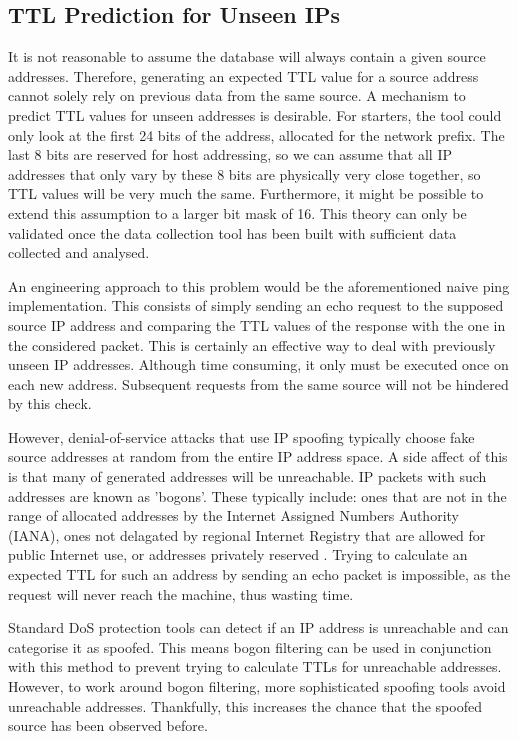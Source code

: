 \documentclass[12pt,twoside]{article}
\begin{document}
\subsection{TTL Prediction for Unseen IPs}
It is not reasonable to assume the database will always contain a given source addresses. Therefore, generating an expected TTL value for a source address cannot solely rely on previous data from the same source. A mechanism to predict TTL values for unseen addresses is desirable. For starters, the tool could only look at the first 24 bits of the address, allocated for the network prefix. The last 8 bits are reserved for host addressing, so we can assume that all IP addresses that only vary by these 8 bits are physically very close together, so TTL values will be very much the same. Furthermore, it might be possible to extend this assumption to a larger bit mask of 16. This theory can only be validated once the data collection tool has been built with sufficient data collected and analysed.

An engineering approach to this problem would be the aforementioned naive ping implementation. This consists of simply sending an echo request to the supposed source IP address and comparing the TTL values of the response with the one in the considered packet. This is certainly an effective way to deal with previously unseen IP addresses. Although time consuming, it only must be executed once on each new address. Subsequent requests from the same source will not be hindered by this check.

However, denial-of-service attacks that use IP spoofing typically choose fake source addresses at random from the entire IP address space. A side affect of this is that many of generated addresses will be unreachable. IP packets with such addresses are known as 'bogons'. These typically include: ones that are not in the range of allocated addresses by the Internet Assigned Numbers Authority (IANA), ones not delagated by regional Internet Registry that are allowed for public Internet use, or addresses privately reserved \cite{rfc1918}. Trying to calculate an expected TTL for such an address by sending an echo packet is impossible, as the request will never reach the machine, thus wasting time.

Standard DoS protection tools can detect if an IP address is unreachable and can categorise it as spoofed. This means bogon filtering can be used in conjunction with this method to prevent trying to calculate TTLs for unreachable addresses. However, to work around bogon filtering, more sophisticated spoofing tools avoid unreachable addresses. Thankfully, this increases the chance that the spoofed source has been observed before.
\end{document}
